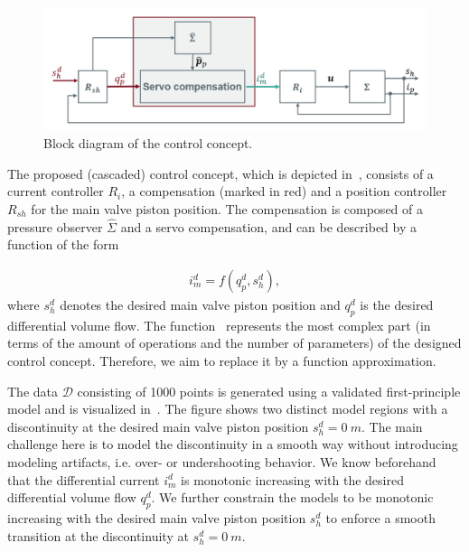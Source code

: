 \begin{figure}[H]
	\centering
	\includegraphics[width=0.8\columnwidth]{graphics/pgfplots/cha5/Bosch/blockschaltbild.png}
	\caption{Block diagram of the control concept.}
	\label{fig:blockschaltbild}
\end{figure}
%
The proposed (cascaded) control concept, which is depicted in~, consists of a current controller $R_i$, a compensation (marked in red) and a position controller $R_{sh}$ for the main valve piston position. The compensation is composed of a pressure observer $\hat{\Sigma}$ and a servo compensation, and can be described by a function of the form 

\begin{align} \label{eq:ex-2-equation}
	i_m^d = f(q_p^d, s_h^d),
\end{align}
%
where $s_h^d$ denotes the desired main valve piston position and $q_p^d$ is the desired differential volume flow. The function~ represents the most complex part (in terms of the amount of operations and the number of parameters) of the designed control concept. Therefore, we aim to replace it by a function approximation. 

The data $\mathcal{D}$ consisting of 1000 points is generated using a validated first-principle model and is visualized in~. The figure shows two distinct model regions with a discontinuity at the desired main valve piston position $s_h^d = 0 \ \si{m}$. The main challenge here is to model the discontinuity in a smooth way without introducing modeling artifacts, i.e. over- or undershooting behavior. We know beforehand that the differential current $i_m^d$ is monotonic increasing with the desired differential volume flow $q_p^d$. We further constrain the models to be monotonic increasing with the desired main valve piston position $s_h^d$ to enforce a smooth transition at the discontinuity at $s_h^d = 0 \ \si{m}$.

